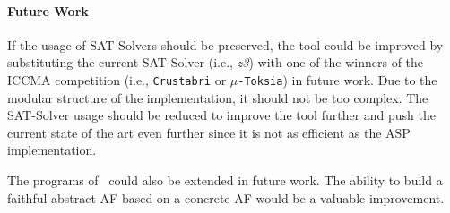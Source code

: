 \paragraph{Future Work} If the usage of SAT-Solvers should be preserved, the tool could be improved by substituting the current SAT-Solver (i.e., \emph{z3}) with one of the winners of the ICCMA competition (i.e., \texttt{Crustabri} or \texttt{$\mu$-Toksia}) in future work. Due to the modular structure of the implementation, it should not be too complex. The SAT-Solver usage should be reduced to improve the tool further and push the current state of the art even further since it is not as efficient as the ASP implementation.

The programs of \prog\ could also be extended in future work. The ability to build a faithful abstract AF based on a concrete AF would be a valuable improvement.
